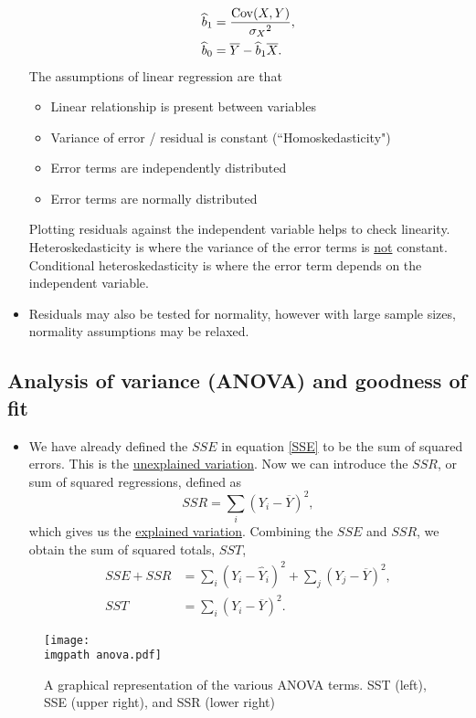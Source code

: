 \documentclass[../notes_compiled.tex]{subfiles}
\begin{document}
\begin{itemize}
\begin{align}
\widehat{b}_{1}&=\frac{\operatorname{Cov}(X,Y)}{{\sigma_{X}}^{2}}, \\
\widehat{b}_{0} &= \overline{Y}-\widehat{b}_{1}\overline{X}.
\end{align}
The assumptions of linear regression are that
\begin{itemize}
\item Linear relationship is present between variables
\item Variance of error / residual is constant (``Homoskedasticity")
\item Error terms are independently distributed
\item Error terms are normally distributed
\end{itemize}
Plotting residuals against the independent variable helps to check linearity. Heteroskedasticity is where the variance of the error terms is \underline{not} constant. Conditional heteroskedasticity is where the error term depends on the independent variable. 
\item Residuals may also be tested for normality, however with large sample sizes, normality assumptions may be relaxed.
\end{itemize}

\subsection{Analysis of variance (ANOVA) and goodness of fit}
\begin{itemize}
\item We have already defined the $SSE$ in equation \ref{SSE} to be the sum of squared errors. This is the \underline{unexplained variation}. Now we can introduce the $SSR$, or sum of squared regressions, defined as
\begin{equation}
SSR =\sum_{i}(Y_{i}-\overline{Y})^{2},
\end{equation}
which gives us the \underline{explained variation}. Combining the $SSE$ and $SSR$, we obtain the sum of squared totals, $SST$,
\begin{align}
SSE + SSR &= \sum_{i}(Y_{i}-\widehat{Y}_{i})^{2} + \sum_{j}(Y_{j}-\overline{Y})^{2}, \\
SST &= \sum_{i}(Y_{i}-\overline{Y})^{2}.
\end{align}
\end{itemize}

\begin{figure}[h]
  \centering
  \texttt{[image: \\imgpath anova.pdf]}
  \caption{A graphical representation of the various ANOVA terms. SST (left), SSE (upper right), and SSR (lower right)}
\end{figure}
\end{document}
